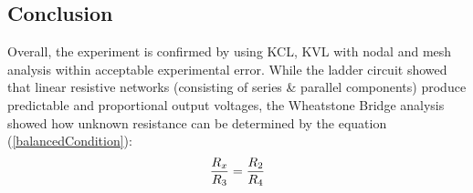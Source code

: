 \documentclass[12pt]{article}
\begin{document}
\subsection{Conclusion}
Overall, the experiment is confirmed by using KCL, KVL with nodal and mesh analysis within acceptable experimental error. While the ladder circuit showed that linear resistive networks (consisting of series \& parallel components) produce predictable and proportional output voltages, the Wheatstone Bridge analysis showed how unknown resistance can be determined by the equation (\ref{balancedCondition}): 
\begin{equation}
    \frac{R_x}{R_3} = \frac{R_2 }{R_4 }
    \notag
\end{equation}
\end{document}
